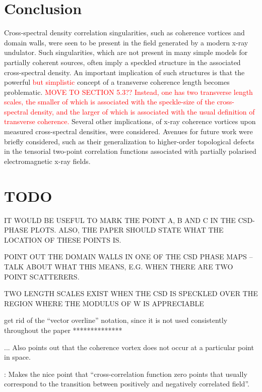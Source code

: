 \documentclass[%
 reprint,
 amsmath,amssymb,
 aps,
]{revtex4-1}
\begin{document}
\section{Conclusion}

Cross-spectral density correlation singularities, such as coherence vortices and domain walls, were seen to be present in the field generated by a modern x-ray undulator.  Such singularities, which are not present in many simple models for partially coherent sources, often imply a speckled structure in the associated cross-spectral density.  An important implication of such structures is that the powerful \textcolor{red}{but simplistic} concept of a transverse coherence length becomes problematic.  \textcolor{red}{ MOVE TO SECTION 5.3?? Instead, one has two transverse length scales, the smaller of which is associated with the speckle-size of the cross-spectral density, and the larger of which is associated with the usual definition of transverse coherence.}  Several other implications, of x-ray coherence vortices upon measured cross-spectral densities, were considered.   Avenues for future work were briefly considered, such as their generalization to higher-order topological defects in the tensorial two-point correlation functions associated with partially polarised electromagnetic x-ray fields.

\section{TODO}

IT WOULD BE USEFUL TO MARK THE POINT A, B AND C IN THE CSD-PHASE PLOTS.  ALSO, THE PAPER SHOULD STATE WHAT THE LOCATION OF THESE POINTS IS.  

POINT OUT THE DOMAIN WALLS IN ONE OF THE CSD PHASE MAPS -- TALK ABOUT WHAT THIS MEANS, E.G. WHEN THERE ARE TWO POINT SCATTERERS.

TWO LENGTH SCALES EXIST WHEN THE CSD IS SPECKLED OVER THE REGION WHERE THE MODULUS OF W IS APPRECIABLE

get rid of the ``vector overline'' notation, since it is not used consistently throughout the paper **************


\cite{GburVisser2003}  ... Also points out that the coherence vortex does not occur at a particular point in space.    

\cite{Rodrigo2015}: Makes the nice point that ``cross-correlation function zero points that usually correspond to the transition between positively and negatively correlated field''.  
\end{document}
